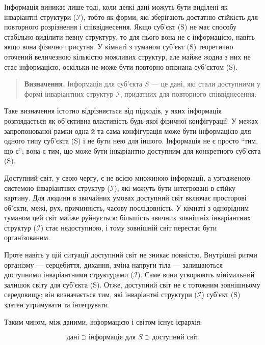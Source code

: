 \documentclass[aps,prd,onecolumn,nofootinbib,superscriptaddress]{revtex4-2} %
\begin{document}
    Інформація виникає лише тоді, коли деякі дані можуть бути виділені як інваріантні структури ($\mathcal{I}$), тобто як форми, які зберігають достатню стійкість для повторного розрізнення і співвіднесення. Якщо суб’єкт (S) не має способу стабільно виділити певну структуру, то для нього вона не є інформацією, навіть якщо вона фізично присутня. У кімнаті з туманом суб’єкт (S) теоретично оточений величезною кількістю можливих структур, але майже жодна з них не стає інформацією, оскільки не може бути повторно впізнана суб’єктом (S).

    \begin{quote}
        \textbf{Визначення.}
        Інформація для суб’єкта \(S\) — це дані, які стали доступними у формі інваріантних структур \(\mathcal{I}\), придатних для повторного співвіднесення.
    \end{quote}

    Таке визначення істотно відрізняється від підходів, у яких інформація розглядається як об’єктивна властивість будь-якої фізичної конфігурації. У межах запропонованої рамки одна й та сама конфігурація може бути інформацією для одного типу суб’єкта (S) і не бути нею для іншого. Інформація не є просто “тим, що є”; вона є тим, що може бути інваріантно доступним для конкретного суб’єкта (S).

    Доступний світ, у свою чергу, є не всією множиною інформації, а узгодженою системою інваріантних структур ($\mathcal{I}$), які можуть бути інтегровані в стійку картину. Для людини в звичайних умовах доступний світ включає просторові об’єкти, межі, рух, причинність, часову послідовність. У кімнаті з однорідним туманом цей світ майже руйнується: більшість звичних зовнішніх інваріантних структур ($\mathcal{I}$) стає недоступною, і тому зовнішній світ перестає бути організованим.

    Проте навіть у цій ситуації доступний світ не зникає повністю. Внутрішні ритми організму — серцебиття, дихання, зміна напруги тіла — залишаються доступними інваріантними структурами ($\mathcal{I}$). Саме вони утворюють мінімальний залишок світу для суб’єкта (S). Отже, доступний світ не є тотожним зовнішньому середовищу; він визначається тим, які інваріантні структури ($\mathcal{I}$) суб’єкт (S) здатен утримувати та інтегрувати.

    Таким чином, між даними, інформацією і світом існує ієрархія:

    \[
        \text{дані} \supset \text{інформація для } S \supset \text{доступний світ}
    \]
\end{document}
